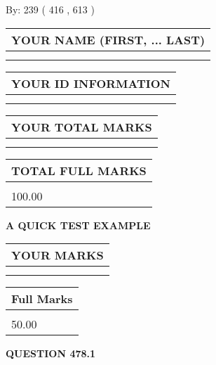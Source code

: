 \documentclass[12pt]{article}
\begin{document}
   
\hspace{1.0in} By: 
 239 ( 416 ,  613 )
   
   
   
   
\newpage 
\setcounter{page}{ 
   478001 } 
   
   
   
   
\noindent\begin{tabular}{|l|}
\hline
YOUR NAME (FIRST, ... LAST)  \\
\hline
 \\ 
 \\ 
\hline
\end{tabular}
\hspace{0.05in} \begin{tabular}{|l|}
\hline
 YOUR   ID   INFORMATION  \\
\hline
 \\ 
 \\ 
\hline
\end{tabular}
   
   
\vspace{0.2in}\noindent\begin{tabular}{|l|}
\hline
YOUR TOTAL MARKS  \\
\hline
 \\ 
 \\ 
\hline
\end{tabular}
\hspace{0.05in} \begin{tabular}{|l|}
\hline
TOTAL FULL MARKS  \\
\hline
 \\ 
100.00 \\
\hline
\end{tabular}
   
   
 \vspace{0.2in}
{\LARGE {\textbf{ A QUICK TEST EXAMPLE}}}
   
   
  
\vspace{0.2in}
  
\noindent\begin{tabular}{|l|}
\hline
 YOUR MARKS  \\
\hline
 \\ 
 \\ 
\hline
\end{tabular}
\hspace{0.05in} \begin{tabular}{|l|}
\hline
 Full Marks  \\
\hline
 \\ 
50.00 \\
\hline
\end{tabular}
{\textbf{\Large{QUESTION
478.1 
}}}
  
\end{document}
